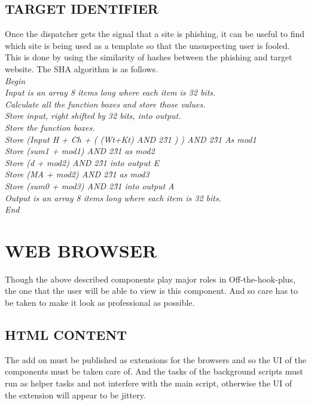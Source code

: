 \subsection{TARGET IDENTIFIER}
Once the dispatcher gets the signal that a site is phishing, it can be useful to find which site is being used as a template so that the unsuspecting user is fooled. This is done by using the similarity of hashes between the phishing and target website. The SHA algorithm is as follows.\\
\null\quad\textit{Begin}\\
\null\quad\quad\textit{Input is an array 8 items long where each item is 32 bits.}\\
\null\quad\quad\textit{Calculate all the function boxes and store those values. }\\
\null\quad\quad\textit{Store input, right shifted by 32 bits, into output. }\\
\null\quad\quad\textit{Store the function boxes.}\\
\null\quad\quad\textit{Store (Input H + Ch + ( (Wt+Kt) AND 2\^31 ) ) AND 2\^31 As mod1}\\
\null\quad\quad\textit{Store (sum1 + mod1) AND 2\^31 as mod2}\\
\null\quad\quad\textit{Store (d + mod2) AND 2\^31 into output E }\\
\null\quad\quad\textit{Store (MA + mod2) AND 2\^31 as mod3}\\
\null\quad\quad\textit{Store (sum0 + mod3) AND 2\^31 into output A}\\
\null\quad\quad\textit{Output is an array 8 items long where each item is 32 bits.}\\
\null\quad\textit{End}\\

\section{WEB BROWSER}
Though the above described components play major roles in Off-the-hook-plus, the one that the user will be able to view is this component. And so care has to be taken to make it look as professional as possible.

\subsection{HTML CONTENT}
The add on must be published as extensions for the browsers and so the UI of the components must be taken care of. And the tasks of the background scripts must run as helper tasks and not interfere with the main script, otherwise the UI of the extension will appear to be jittery.

